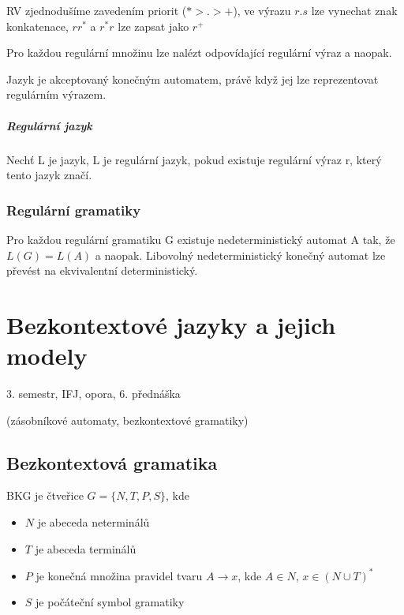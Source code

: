 \documentclass[a4wide]{report}
\begin{document}
RV zjednodušíme zavedením priorit ($* > . > +$), ve výrazu $r.s$ lze vynechat znak konkatenace, $rr^*$ a $r^*r$ lze zapsat jako $r^+$

Pro každou regulární množinu lze nalézt odpovídající regulární výraz a naopak.

Jazyk je akceptovaný konečným automatem, právě když jej lze reprezentovat regulárním výrazem.

\paragraph{Regulární jazyk}
Nechť L je jazyk, L je regulární jazyk, pokud existuje regulární výraz r, který tento jazyk značí.

\subsection{Regulární gramatiky}
Pro každou regulární gramatiku G existuje nedeterministický automat A tak, že $L(G) = L(A)$ a naopak. Libovolný nedeterministický konečný automat lze převést na ekvivalentní deterministický.




























\chapter{Bezkontextové jazyky a jejich modely} \label{cha:21}

3. semestr, IFJ, opora, 6. přednáška

(zásobníkové automaty, bezkontextové gramatiky)


\section{Bezkontextová gramatika}

BKG je čtveřice $G = \{N, T, P, S\}$, kde
\begin{itemize}
	\item $N$ je abeceda neterminálů
	\item $T$ je abeceda terminálů
	\item $P$ je konečná množina pravidel tvaru $A \to x$, kde $A \in N$, $x \in (N \cup T)^*$
	\item $S$ je počáteční symbol gramatiky
\end{itemize}
\end{document}
